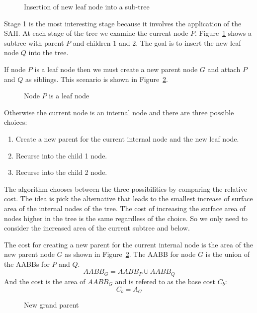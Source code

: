 \documentclass{article}
\begin{document}
\begin{figure}
	\begin{center}
		
	\end{center}
	\caption{Insertion of new leaf node into a sub-tree}
	\label{fig:new_leaf}
\end{figure}

Stage 1 is the most interesting stage because it involves the application of the SAH. At each stage of the tree we examine the current node $P$. Figure~\ref{fig:new_leaf} shows a subtree with parent $P$ and children $1$ and $2$. The goal is to insert the new leaf node $Q$ into the tree.

If node $P$ is a leaf node then we must create a new parent node $G$ and attach $P$ and $Q$ as siblings. This scenario is shown in Figure~\ref{fig:single_leaf}.

\begin{figure}
	\begin{center}
		
	\end{center}
	\caption{Node $P$ is a leaf node}
	\label{fig:single_leaf}
\end{figure}

Otherwise the current node is an internal node and there are three possible choices:
\begin{enumerate}
	\item Create a new parent for the current internal node and the new leaf node.
	\item Recurse into the child 1 node.
	\item Recurse into the child 2 node.
\end{enumerate}
The algorithm chooses between the three possibilities by comparing the relative cost. The idea is pick the alternative that leads to the smallest increase of surface area of the internal nodes of the tree. The cost of increasing the surface area of nodes higher in the tree is the same regardless of the choice. So we only need to consider the increased area of the current subtree and below.

The cost for creating a new parent for the current internal node is the area of the new parent node $G$ as shown in Figure~\ref{fig:single_leaf}. The AABB for node $G$ is the union of the AABBs for $P$ and $Q$.
\[AABB_G = AABB_P \cup AABB_Q \]
And the cost is the area of $AABB_G$ and is refered to as the base cost $C_b$:
\[ C_b = A_G \]

\begin{figure}
	\begin{center}
		
	\end{center}
	\caption{New grand parent}
	\label{fig:grand_parent}
\end{figure}
\end{document}
